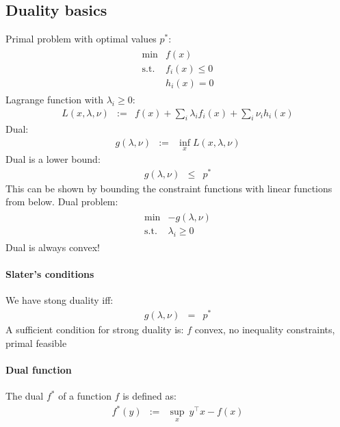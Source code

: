 \documentclass[10pt,english]{article}
\begin{document}
\subsection{Duality basics}
Primal problem with optimal values $p^\ast$:
\begin{eqnarray*}
 \begin{array}{ll} 	\mbox{min}	&	f(x)\\
			\mbox{s.t.}	&	f_i(x)\leq 0\\
					&	h_i(x)=0
 \end{array}
\end{eqnarray*}
Lagrange function with $\lambda_i\geq0$:
\begin{eqnarray*}
 L(x,\lambda,\nu)	&:=&	f(x)+\sum_{i}\lambda_if_i(x)+\sum_i\nu_ih_i(x)
\end{eqnarray*}
Dual:
\begin{eqnarray*}
 g(\lambda,\nu)	&:=&	\inf_x L(x,\lambda,\nu)
\end{eqnarray*}
Dual is a lower bound:
\begin{eqnarray*}
 g(\lambda,\nu)	&\leq&	p^\ast
\end{eqnarray*}
This can be shown by bounding the constraint functions with linear functions from below.
Dual problem:
\begin{eqnarray*}
 \begin{array}{ll} 	\mbox{min}	&	-g(\lambda,\nu)\\
			\mbox{s.t.}	&	\lambda_i\geq 0
 \end{array}
\end{eqnarray*}
Dual is always convex!
\paragraph{Slater's conditions}
We have stong duality iff:
\begin{eqnarray*}
 g(\lambda,\nu)	&=&	p^\ast
\end{eqnarray*}
A sufficient condition for strong duality is: $f$ convex, no inequality constraints, primal feasible

\paragraph{Dual function}
The dual $f^\ast$ of a function $f$ is defined as:
\begin{eqnarray*}
 f^\ast(y)	&:=&	\sup_x \   y^\top x - f(x)
\end{eqnarray*}
\end{document}
